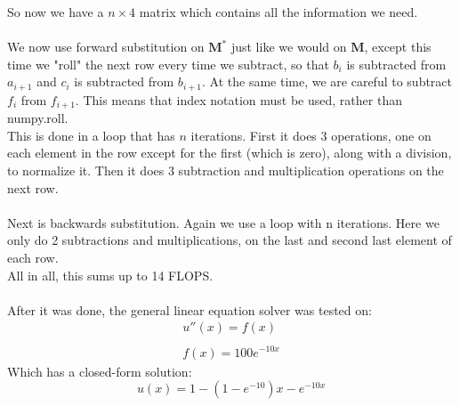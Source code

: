 \documentclass[a4paper,12pt,norsk]{article}
\begin{document}
	So now we have a $n \times 4$ matrix which contains all the information we need.\\
	\\
	We now use forward substitution on $\textbf{M}^*$ just like we would on $\textbf{M}$, except this time we "roll" the next row every time we subtract, so that $b_i$ is subtracted from $a_{i+1}$ and $c_i$ is subtracted from $b_{i+1}$. At the same time, we are careful to subtract $f_i$ from $f_{i+1}$. This means that index notation must be used, rather than numpy.roll.\\
	This is done in a loop that has $n$ iterations. First it does 3 operations, one on each element in the row except for the first (which is zero), along with a division, to normalize it. Then it does 3 subtraction and multiplication operations on the next row.\\
	\\
	Next is backwards substitution. Again we use a loop with n iterations. Here we only do 2 subtractions and multiplications, on the last and second last element of each row.\\
	All in all, this sums up to 14 FLOPS.\\
	\\
	After it was done, the general linear equation solver was tested on:
	\begin{gather*}
		u''(x) = f(x)\\
		\\
		f(x) = 100e^{-10x}
	\end{gather*}
	Which has a closed-form solution:
	$$u(x) = 1 - (1 - e^{-10})x - e^{-10x} $$
\end{document}
